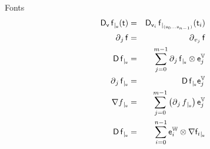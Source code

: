 \documentclass{PalisadesLakesArticle}
\begin{document}
\begin{plSection}{Fonts}
\begin{eqnarray}
\Derivative[\Vector{v}]{\Vector{f}}[\Vector{u}][\Vector{t}]
& = &
\Derivative[\Vector{v}_i]{\Vector{f}}
[(\Vector{u}_0 \ldots \Vector{u}_{n-1})][\Vector{t}_i] 
\\
\Partial{j}{\Vector{f}} & = &\Partial{v_j}{\Vector{f}} 
\\
\Derivative{\Vector{f}}[\Vector{u}]
& = &
\sum_{j=0}^{m-1} \Partial{j}{\Vector{f}}[\Vector{u}] 
\otimes \Vector{e}_j^{\Space{V}}
\\
\Partial{j}{\Vector{f}}[\Vector{u}]
& = &
\Derivative{\Vector{f}}[\Vector{u}] \Vector{e}_j^{\Space{V}}
\\
\Gradient{f}[\Vector{u}] 
& = &
\sum_{j=0}^{m-1} 
\left( 
\Partial{j}{f}[\Vector{u}] 
\right) \Vector{e}_j^{\Space{V}}
\\
\Derivative{\Vector{f}}[\Vector{u}]
& = &
 \sum_{i=0}^{n-1}  
\Vector{e}_i^{\Space{W}} 
\otimes \Gradient{\Vector{f}_i}[\Vector{u}]
\end{eqnarray}
\end{plSection}%
\end{document}

